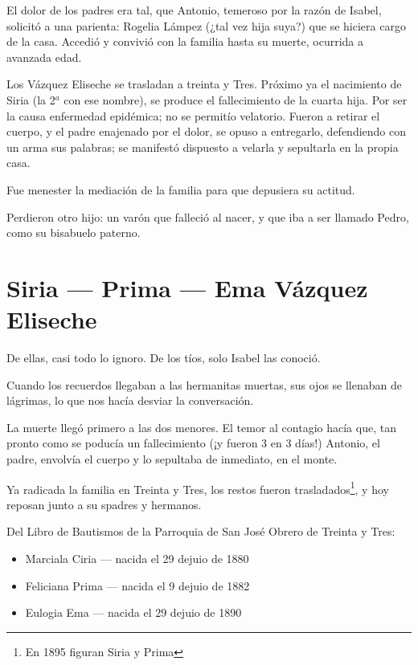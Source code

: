 \documentclass[a4paper]{article}
\begin{document}
El dolor de los padres era tal, que Antonio, temeroso por la razón de Isabel, solicitó a una parienta: Rogelia Lámpez (¿tal vez hija suya?) que se hiciera cargo de la casa. Accedió y convivió con la familia hasta su muerte, ocurrida a avanzada edad.

Los Vázquez Eliseche se trasladan a treinta y Tres. Próximo ya el nacimiento de Siria (la 2$^{a}$ con ese nombre), se produce el fallecimiento de la cuarta hija. Por ser la causa enfermedad epidémica; no se permitío velatorio. Fueron a retirar el cuerpo, y el padre enajenado por el dolor, se opuso a entregarlo, defendiendo con un arma sus palabras; se manifestó dispuesto a velarla y sepultarla en la propia casa.

Fue menester la mediación de la familia para que depusiera su actitud.

\bigbreak{}

Perdieron otro hijo: un varón que falleció al nacer, y que iba a ser llamado Pedro, como su bisabuelo paterno.

\section{Siria --- Prima --- Ema Vázquez Eliseche}

De ellas, casi todo lo ignoro. De los tíos, solo Isabel las conoció.

Cuando los recuerdos llegaban a las hermanitas muertas, sus ojos se llenaban de lágrimas, lo que nos hacía desviar la conversación.

La muerte llegó primero a las dos menores. El temor al contagio hacía que, tan pronto como se poducía un fallecimiento (¡y fueron 3 en 3 días!) Antonio, el padre, envolvía el cuerpo y lo sepultaba de inmediato, en el monte.

Ya radicada la familia en Treinta y Tres, los restos fueron trasladados\footnote{En 1895 figuran Siria y Prima}, y hoy reposan junto a su spadres y hermanos.

\bigbreak{}

Del Libro de Bautismos de la Parroquia de San José Obrero de Treinta y Tres:

\begin{itemize}
    \item{Marciala Ciria --- nacida el 29 dejuio de 1880}
    \item{Feliciana Prima --- nacida el 9 dejuio de 1882}
    \item{Eulogia Ema --- nacida el 29 dejuio de 1890}
\end{itemize}
\end{document}
